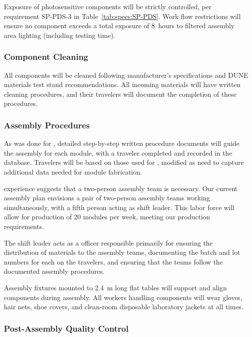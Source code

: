 Exposure of photosensitive components will be strictly controlled, per requirement SP-PDS-3 in Table~\ref{tab:specs:SP-PDS}.  
Work flow restrictions will %
ensure no component exceeds a total exposure of \SI{8}{hours} to filtered assembly area lighting (including testing time).

\subsubsection{Component Cleaning}
\label{sssec:cleaning}
All components will be cleaned 
following manufacturer's specifications and DUNE materials test stand recommendations.  
All incoming materials will have written cleaning procedures, and their travelers will document the completion of these procedures.

\subsubsection{Assembly Procedures}

As was done for , detailed step-by-step written procedure documents will 
guide the assembly for each  module, with a  traveler 
completed and recorded in the database.  Travelers will be based on those used for , modified as need to capture additional data needed for  module fabrication.

 experience suggests that a two-person assembly team is necessary.
Our current assembly plan envisions a pair of two-person assembly teams working simultaneously, with a fifth person acting as shift leader.  This labor force will allow for production of \num{20}  modules per week, meeting our production requirements.  

The shift leader acts as a  officer responsible primarily for ensuring the distribution of materials to the assembly teams, documenting the batch and lot numbers for each  on the travelers, and ensuring that the teams follow the documented assembly procedures.

Assembly fixtures mounted to \SI{2.4}{m} long flat tables will %
support and align  components during assembly.  All workers handling  components will wear gloves, hair nets, shoe covers, and clean-room disposable laboratory jackets at all times.

\subsubsection{Post-Assembly Quality Control}

